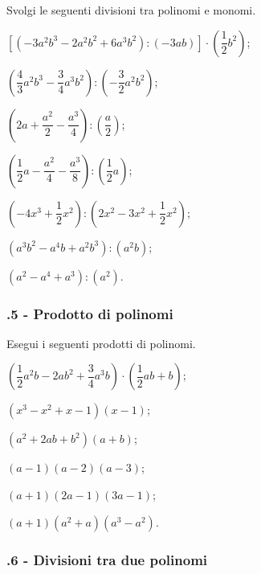 \begin{esercizio}
\label{ese:11.22} %
 Svolgi le seguenti divisioni tra polinomi e monomi.

\begin{enumeratea}
 \item $\left[\left(-3a^{2}b^{3}-2a^{2}b^{2}+6a^{3}b^{2}\right):(-3{ab})\right]\cdot\left(\dfrac{1}{2}b^{2}\right)$;
 \item $\left(\dfrac{4}{3}a^{2}b^{3}-\dfrac{3}{4}a^{3}b^{2}\right):\left(-{\dfrac{3}{2}a^{2}b^{2}}\right)$;
 \item $\left(2a+\dfrac{a^{2}}{2}-\dfrac{a^{3}}{4}\right):\left(\dfrac{a}{2}\right)$;
 \item $\left(\dfrac{1}{2}a-\dfrac{a^{2}}{4}-\dfrac{a^{3}}{8}\right):\left(\dfrac{1}{2}a\right)$;
 \item $\left(-4x^{3}+\dfrac{1}{2}x^{2}\right):\left(2x^{2}-3x^{2}+\dfrac{1}{2}x^{2}\right)$;
 \item $\left(a^{3}b^{2}-a^{4}b+a^{2}b^{3}\right):\left(a^{2}b\right)$;
 \item $\left(a^{2}-a^{4}+a^{3}\right):\left(a^{2}\right)$.
\end{enumeratea}
\end{esercizio}

\subsubsection*{\thechapter.5 - Prodotto di polinomi}
\begin{esercizio}
\label{ese:11.23} %
Esegui i seguenti prodotti di polinomi.
\begin{multicols}{2}
\begin{enumeratea}
 \item $\left(\dfrac{1}{2}a^{2}b-2{ab}^{2}+\dfrac{3}{4}a^{3}b\right)\cdot\left(\dfrac{1}{2}{ab}+b\right)$;
 \item $\left(x^{3}-x^{2}+x-1\right)({x}-1)$;
 \item $\left(a^{2}+2{ab}+b^{2}\right)(a+b)$;
 \item $(a-1)(a-2)(a-3)$;
 \item $(a+1)(2a-1)(3a-1)$;
 \item $(a+1)\left(a^{2}+a\right)\left(a^{3}-a^{2}\right)$.
\end{enumeratea}
\end{multicols}
\end{esercizio}

\subsubsection*{\thechapter.6 - Divisioni tra due polinomi}

